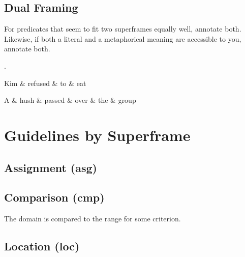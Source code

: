 \documentclass[a4paper]{article}
\begin{document}
\subsection{Dual Framing}

For predicates that seem to fit two superframes equally well, annotate both. Likewise, if both a literal and a metaphorical meaning are accessible to you, annotate both.

\ex.
\begin{dependency}
    \begin{deptext}
        Kim \& refused \& to \& eat \\
    \end{deptext}
\end{dependency}
\begin{dependency}
    \begin{deptext}
        A \& hush \& passed \& over \& the \& group \\
    \end{deptext}
\end{dependency}

\section{Guidelines by Superframe}


\subsection{Assignment (asg)}

\subsection{Comparison (cmp)}

The domain is compared to the range for some criterion.

\subsection{Location (loc)}
\end{document}
